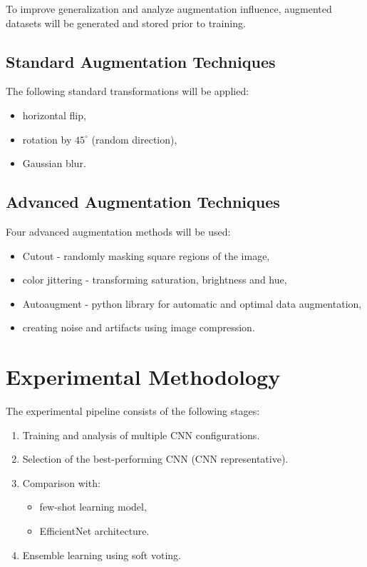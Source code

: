 \documentclass[11pt,a4paper]{article}
\begin{document}
To improve generalization and analyze augmentation influence, augmented datasets will be generated and stored prior to training.

\subsection{Standard Augmentation Techniques}

The following standard transformations will be applied:

\begin{itemize}
    \item horizontal flip,
    \item rotation by $45^\circ$ (random direction),
    \item Gaussian blur.
\end{itemize}

\subsection{Advanced Augmentation Techniques}

Four advanced augmentation methods will be used:

\begin{itemize}
    \item Cutout - randomly masking square regions of the image,
    \item color jittering - transforming saturation, brightness and hue,
    \item Autoaugment - python library for automatic and optimal data augmentation,
    \item creating noise and artifacts using image compression.
\end{itemize}


\section{Experimental Methodology}

The experimental pipeline consists of the following stages:

\begin{enumerate}
    \item Training and analysis of multiple CNN configurations.
    \item Selection of the best-performing CNN (CNN representative).
    \item Comparison with:
    \begin{itemize}
        \item few-shot learning model,
        \item EfficientNet architecture.
    \end{itemize}
    \item Ensemble learning using soft voting.
\end{enumerate}
\end{document}
